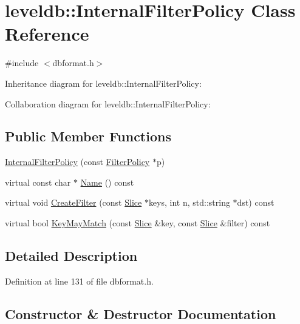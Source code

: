 \hypertarget{classleveldb_1_1_internal_filter_policy}{}\section{leveldb\+:\+:Internal\+Filter\+Policy Class Reference}
\label{classleveldb_1_1_internal_filter_policy}


{\ttfamily \#include $<$dbformat.\+h$>$}



Inheritance diagram for leveldb\+:\+:Internal\+Filter\+Policy\+:


Collaboration diagram for leveldb\+:\+:Internal\+Filter\+Policy\+:
\subsection*{Public Member Functions}
\begin{DoxyCompactItemize}
\item 
\hyperlink{classleveldb_1_1_internal_filter_policy_a55469eb6ea941243cd1c65eb14bd8978}{Internal\+Filter\+Policy} (const \hyperlink{classleveldb_1_1_filter_policy}{Filter\+Policy} $\ast$p)
\item 
virtual const char $\ast$ \hyperlink{classleveldb_1_1_internal_filter_policy_ab7f6002d74ba6a2838e1fc826e2095fc}{Name} () const 
\item 
virtual void \hyperlink{classleveldb_1_1_internal_filter_policy_a1c7c7b7eecdfb872e35708793d82ab40}{Create\+Filter} (const \hyperlink{classleveldb_1_1_slice}{Slice} $\ast$keys, int n, std\+::string $\ast$dst) const 
\item 
virtual bool \hyperlink{classleveldb_1_1_internal_filter_policy_a42dc5124aa139c68bec2efa7417a7373}{Key\+May\+Match} (const \hyperlink{classleveldb_1_1_slice}{Slice} \&key, const \hyperlink{classleveldb_1_1_slice}{Slice} \&filter) const 
\end{DoxyCompactItemize}


\subsection{Detailed Description}


Definition at line 131 of file dbformat.\+h.



\subsection{Constructor \& Destructor Documentation}
\hypertarget{classleveldb_1_1_internal_filter_policy_a55469eb6ea941243cd1c65eb14bd8978}{}
